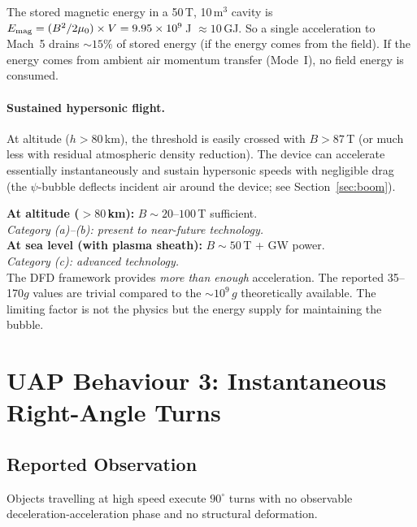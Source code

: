 \documentclass[12pt,a4paper]{article}
\begin{document}
The stored magnetic energy in a 50\,T, 10\,m$^3$ cavity is
$E_{\rm mag} = (B^2/2\mu_0)\times V = 9.95\times 10^9$\,J $\approx 10$\,GJ.
So a single acceleration to Mach~5 drains $\sim 15\%$ of stored energy
(if the energy comes from the field).  If the energy comes from ambient
air momentum transfer (Mode~I), no field energy is consumed.

\paragraph{Sustained hypersonic flight.}
At altitude ($h > 80$\,km), the threshold is easily crossed with $B > 87$\,T
(or much less with residual atmospheric density reduction).  The device can
accelerate essentially instantaneously and sustain hypersonic speeds
with negligible drag (the $\psi$-bubble deflects incident air around the
device; see Section~\ref{sec:boom}).

\begin{tcolorbox}[colback=green!5!white, colframe=green!60!black,
  title=Hypersonic Acceleration Assessment]
\textbf{At altitude ($> 80$\,km):} $B \sim 20$--$100$\,T sufficient.\\
\emph{Category (a)--(b): present to near-future technology.}\\[4pt]
\textbf{At sea level (with plasma sheath):} $B \sim 50$\,T + GW power.\\
\emph{Category (c): advanced technology.}\\[4pt]
The DFD framework provides \emph{more than enough} acceleration.
The reported 35--170$g$ values are trivial compared to the $\sim 10^9\,g$
theoretically available.  The limiting factor is not the physics but
the energy supply for maintaining the bubble.
\end{tcolorbox}


\section{UAP Behaviour 3: Instantaneous Right-Angle Turns}\label{sec:turns}

\subsection{Reported Observation}

Objects travelling at high speed execute $90^\circ$ turns with no
observable deceleration-acceleration phase and no structural deformation.
\end{document}
